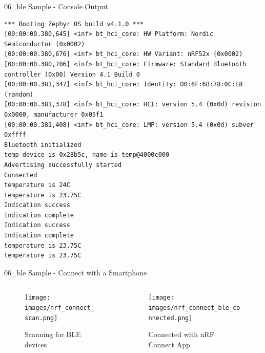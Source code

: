 \documentclass[10pt, aspectratio=169]{beamer}
\begin{document}
\begin{frame}[fragile]{06\_ble Sample - Console Output}
  \begin{listing}[H]
    \begin{verbatim}
*** Booting Zephyr OS build v4.1.0 ***
[00:00:00.380,645] <inf> bt_hci_core: HW Platform: Nordic Semiconductor (0x0002)
[00:00:00.380,676] <inf> bt_hci_core: HW Variant: nRF52x (0x0002)
[00:00:00.380,706] <inf> bt_hci_core: Firmware: Standard Bluetooth controller (0x00) Version 4.1 Build 0
[00:00:00.381,347] <inf> bt_hci_core: Identity: D0:6F:6B:78:0C:E8 (random)
[00:00:00.381,378] <inf> bt_hci_core: HCI: version 5.4 (0x0d) revision 0x0000, manufacturer 0x05f1
[00:00:00.381,408] <inf> bt_hci_core: LMP: version 5.4 (0x0d) subver 0xffff
Bluetooth initialized
temp device is 0x28b5c, name is temp@4000c000
Advertising successfully started
Connected
temperature is 24C
temperature is 23.75C
Indication success
Indication complete
Indication success
Indication complete
temperature is 23.75C
temperature is 23.75C
    \end{verbatim}
  \end{listing}
\end{frame}
\begin{frame}[fragile]{06\_ble Sample - Connect with a Smartphone}
  \begin{columns}
    \begin{column}{0.5\textwidth}
      \begin{figure}
        \texttt{[image: images/nrf\_connect\_scan.png]}
        \caption*{Scanning for BLE devices}
      \end{figure}
    \end{column}
    \begin{column}{0.5\textwidth}
      \begin{figure}
        \texttt{[image: images/nrf\_connect\_ble\_connected.png]}
        \caption*{Connected with nRF Connect App}
      \end{figure}
    \end{column}
  \end{columns}
\end{frame}
\end{document}
